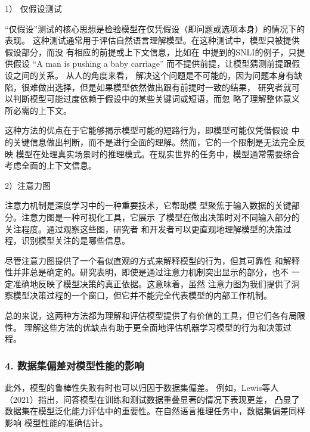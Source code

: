 1） 仅假设测试

``仅假设''测试的核心思想是检验模型在仅凭假设（即问题或选项本身）的情况下的表现。
这种测试通常用于评估自然语言理解模型。在这种测试中，模型只被提供假设部分，而没
有相应的前提或上下文信息，比如在  中提到的SNLI的例子，只提供假设
``A man is pushing a baby carriage'' 而不提供前提，让模型猜测前提跟假设之间的关系。
从人的角度来看，
解决这个问题是不可能的，因为问题本身有缺陷，很难做出选择，但是如果模型依然做出跟有前提时一致的结果，
研究者就可以判断模型可能过度依赖于假设中的某些关键词或短语，而忽
略了理解整体意义所必需的上下文。

这种方法的优点在于它能够揭示模型可能的短路行为，即模型可能仅凭借假设
中的关键信息做出判断，而不是进行全面的理解。然而，它的一个限制是无法完全反映
模型在处理真实场景时的推理模式。在现实世界的任务中，模型通常需要综合考虑全面的上下文信息。

2）注意力图

注意力机制是深度学习中的一种重要技术，它帮助模
型聚焦于输入数据的关键部分。注意力图是一种可视化工具，它展示
了模型在做出决策时对不同输入部分的关注程度。通过观察这些图，研究者
和开发者可以更直观地理解模型的决策过程，识别模型关注的是哪些信息。

尽管注意力图提供了一个看似直观的方式来解释模型的行为，但其可靠性
和解释性并非总是确定的。研究表明，即使是通过注意力机制突出显示的部分，也不
一定准确地反映了模型决策的真正依据\cite{jain2019attention}。这意味着，虽然
注意力图为我们提供了洞察模型决策过程的一个窗口，但它并不能完全代表模型的内部工作机制。

总的来说，这两种方法都为理解和评估模型提供了有价值的工具，但它们各有局限性。
理解这些方法的优缺点有助于更全面地评估机器学习模型的行为和决策过程。


\subsubsection*{4. 数据集偏差对模型性能的影响}
此外，模型的鲁棒性失败有时也可以归因于数据集偏差。
例如，Lewis等人（2021）\cite{lewis2021question}指出，问答模型在训练和测试数据重叠显著的情况下表现更差，
凸显了数据集在模型泛化能力评估中的重要性。在自然语言推理任务中，数据集偏差同样影响
模型性能的准确估计\cite{bras2020adversarial}。

